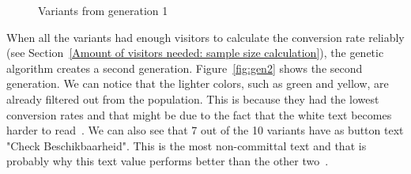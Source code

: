 \documentclass{report}
\begin{document}
\begin{figure}[ht]
	
	\caption{Variants from generation 1}
	\label{fig:gen1}
\end{figure}
\FloatBarrier
When all the variants had enough visitors to calculate the conversion rate reliably (see Section~\ref{Amount of visitors needed: sample size calculation}), the genetic algorithm creates a second generation. Figure~\ref{fig:gen2} shows the second generation. We can notice that the lighter colors, such as green and yellow, are already filtered out from the population. This is because they had the lowest conversion rates and that might be due to the fact that the white text becomes harder to read~\cite{leavitt2006research, thatcher2002constructing}. We can also see that 7 out of the 10 variants have as button text "Check Beschikbaarheid". This is the most non-committal text and that is probably why this text value performs better than the other two~\cite{cta}.\\
\end{document}
